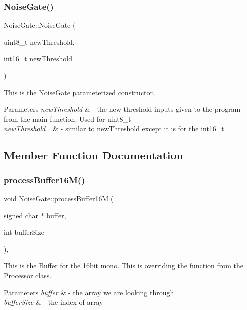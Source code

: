 \subsubsection{\texorpdfstring{Noise\+Gate()}{NoiseGate()}}
{\footnotesize\ttfamily Noise\+Gate\+::\+Noise\+Gate (\begin{DoxyParamCaption}\item[{uint8\+\_\+t}]{new\+Threshold,  }\item[{int16\+\_\+t}]{new\+Threshold\+\_ }\end{DoxyParamCaption})}

This is the \hyperlink{classNoiseGate}{Noise\+Gate} parameterized constructor. 
\begin{DoxyParams}{Parameters}
{\em new\+Threshold} & -\/ the new threshold inputs given to the program from the main function. Used for uint8\+\_\+t \\
\hline
{\em new\+Threshold\+\_} & -\/ similar to new\+Threshold except it is for the int16\+\_\+t \\
\hline
\end{DoxyParams}


\subsection{Member Function Documentation}
\mbox{\label{classNoiseGate_a56265390315ad1c22571742d50453f36}} 
\subsubsection{\texorpdfstring{process\+Buffer16\+M()}{processBuffer16M()}}
{\footnotesize\ttfamily void Noise\+Gate\+::process\+Buffer16M (\begin{DoxyParamCaption}\item[{signed char $\ast$}]{buffer,  }\item[{int}]{buffer\+Size }\end{DoxyParamCaption})\hspace{0.3cm}{\ttfamily [override]}, {\ttfamily [virtual]}}

This is the Buffer for the 16bit mono. This is overriding the function from the \hyperlink{classProcessor}{Processor} class. 
\begin{DoxyParams}{Parameters}
{\em buffer} & -\/ the array we are looking through \\
\hline
{\em buffer\+Size} & -\/ the index of array \\
\hline
\end{DoxyParams}


